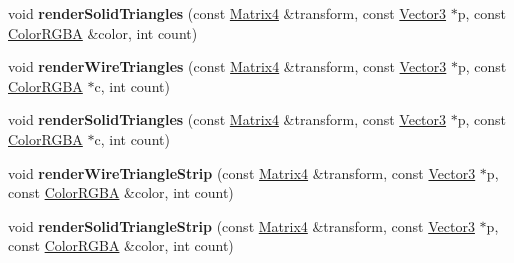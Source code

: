 \begin{DoxyCompactItemize}
\item 
void {\bfseries render\+Solid\+Triangles} (const \hyperlink{class_magnum_1_1_matrix4}{Matrix4} \&transform, const \hyperlink{class_magnum_1_1_vector3}{Vector3} $\ast$p, const \hyperlink{class_magnum_1_1_color_r_g_b_a}{Color\+R\+G\+BA} \&color, int count)\hypertarget{class_magnum_1_1_i_component_debug_renderer_a39b58dbe83fa0b030da0b5b5d208bead}{}\label{class_magnum_1_1_i_component_debug_renderer_a39b58dbe83fa0b030da0b5b5d208bead}

\item 
void {\bfseries render\+Wire\+Triangles} (const \hyperlink{class_magnum_1_1_matrix4}{Matrix4} \&transform, const \hyperlink{class_magnum_1_1_vector3}{Vector3} $\ast$p, const \hyperlink{class_magnum_1_1_color_r_g_b_a}{Color\+R\+G\+BA} $\ast$c, int count)\hypertarget{class_magnum_1_1_i_component_debug_renderer_a2e39808f69cf651fc799059838f951ab}{}\label{class_magnum_1_1_i_component_debug_renderer_a2e39808f69cf651fc799059838f951ab}

\item 
void {\bfseries render\+Solid\+Triangles} (const \hyperlink{class_magnum_1_1_matrix4}{Matrix4} \&transform, const \hyperlink{class_magnum_1_1_vector3}{Vector3} $\ast$p, const \hyperlink{class_magnum_1_1_color_r_g_b_a}{Color\+R\+G\+BA} $\ast$c, int count)\hypertarget{class_magnum_1_1_i_component_debug_renderer_a445e495b20e18aa8a47fc54c9cf4221d}{}\label{class_magnum_1_1_i_component_debug_renderer_a445e495b20e18aa8a47fc54c9cf4221d}

\item 
void {\bfseries render\+Wire\+Triangle\+Strip} (const \hyperlink{class_magnum_1_1_matrix4}{Matrix4} \&transform, const \hyperlink{class_magnum_1_1_vector3}{Vector3} $\ast$p, const \hyperlink{class_magnum_1_1_color_r_g_b_a}{Color\+R\+G\+BA} \&color, int count)\hypertarget{class_magnum_1_1_i_component_debug_renderer_ae8fca2b8db8a3fcc40c585051cbe952c}{}\label{class_magnum_1_1_i_component_debug_renderer_ae8fca2b8db8a3fcc40c585051cbe952c}

\item 
void {\bfseries render\+Solid\+Triangle\+Strip} (const \hyperlink{class_magnum_1_1_matrix4}{Matrix4} \&transform, const \hyperlink{class_magnum_1_1_vector3}{Vector3} $\ast$p, const \hyperlink{class_magnum_1_1_color_r_g_b_a}{Color\+R\+G\+BA} \&color, int count)\hypertarget{class_magnum_1_1_i_component_debug_renderer_a3302ff82d543f152dac1a0847a8b78d6}{}\label{class_magnum_1_1_i_component_debug_renderer_a3302ff82d543f152dac1a0847a8b78d6}


\end{DoxyCompactItemize}
